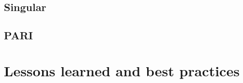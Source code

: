 \documentclass{deliverablereport}
\begin{document}




\subsection{Singular}



\subsection{PARI}


\hypertarget{best-practices}{%
\section{Lessons learned and best practices}\label{best-practices}}
\end{document}
